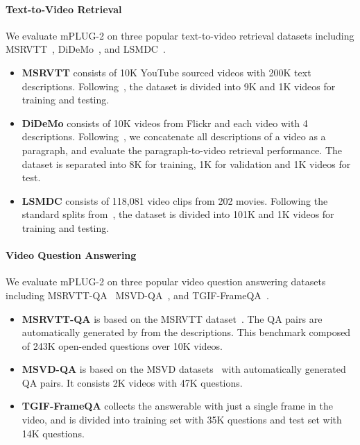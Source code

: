 \documentclass{article}
\theoremstyle{plain}
\theoremstyle{definition}
\theoremstyle{remark}
\newcommand{\modelname}{mPLUG-2 }
\begin{document}
\paragraph{Text-to-Video Retrieval} We evaluate \modelname on three popular
text-to-video retrieval datasets including MSRVTT~\citep{xu2016msrvtt},
DiDeMo~\citep{anne2017didemo}, and LSMDC~\citep{rohrbach2015lsmdc}.
\begin{itemize}
    \item \textbf{MSRVTT} consists of 10K YouTube sourced videos with 200K text descriptions. Following~\citep{li2022lavender, luo2022clip4clip, huang2022clover}, the dataset is divided into 9K and 1K videos for training and testing.
    \item \textbf{DiDeMo} consists of 10K videos from Flickr and each video with 4 descriptions. Following~\citep{li2022alpro, ma2022xclip, li2022lavender}, we concatenate all descriptions of a video as a paragraph, and evaluate the paragraph-to-video retrieval performance. The dataset is separated into 8K for training, 1K for validation and 1K videos for test.
    \item \textbf{LSMDC} consists of 118,081 video clips from 202 movies. Following the standard splits from~\citep{rohrbach2015lsmdc}, the dataset is divided into 101K and 1K videos for training and testing.

\end{itemize}

\paragraph{Video Question Answering}
We evaluate \modelname on three popular
video question answering datasets including MSRVTT-QA~\citep{xu2017msrvttqa} MSVD-QA~\citep{xu2017msrvttqa}, and TGIF-FrameQA~\citep{jang2017tgif}.


\begin{itemize}
    \item \textbf{MSRVTT-QA} is based on the MSRVTT dataset~\citep{xu2016msrvtt}. The QA pairs are automatically generated by from the descriptions. This benchmark composed of 243K open-ended questions over 10K videos.
    \item \textbf{MSVD-QA} is based on the MSVD datasets~\citep{chen2011msvd} with automatically generated QA pairs. It consists 2K videos with 47K questions.
    \item \textbf{TGIF-FrameQA} collects the answerable with just a single frame in the video, and is divided into training set with 35K questions and test set with 14K questions.
\end{itemize}
\end{document}
